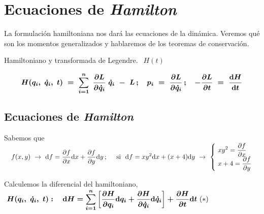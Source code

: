 \chapter{Ecuaciones de \emph{Hamilton}}


\vspace{1cm}

\begin{adjustwidth}{50pt}{50pt}
\begin{ejemplo}
La formulación hamiltoniana nos dará las ecuaciones de la dinámica. Veremos qué son los momentos generalizados y hablaremos de los teoremas de conservación.
\end{ejemplo}
\end{adjustwidth}
	

\vspace{1cm}
\begin{myblock}{Hamiltoniano y transformada de Legendre. $\ \ H(t)$}

\begin{large}
\begin{equation}
\label{T13inicio}
\boldsymbol{
H(q_i,\ \dot q_i,\ t) \ = \ \sum_{i=1}^n\ \pdv{L}{\dot q_i} \ \dot q_i \ - \ L \, ;
\quad
p_i\ = \ \pdv{L}{\dot q_i} \, ; 
\quad
- \pdv{L}{t} \ = \ \dv{H}{t} }	
\end{equation}
\end{large}
\end{myblock}

\vspace{0.5cm}

\section{Ecuaciones de \emph{Hamilton}}

Sabemos que $\quad \displaystyle f(x,y) \ \to \ \dd f=\pdv{f}{x} \dd x + \pdv{f}{y} \dd y \, ; \quad \text{ si } \ \dd f=xy^2 \dd x + (x+4)\dd y \ \to \ \begin{cases} \ \displaystyle xy^2=\pdv{f}{x} \\ \ \displaystyle x+4=\pdv{f}{y} \end{cases}$
 
Calculemos la diferencial del hamiltoniano, $\boldsymbol{ \ H(q_i,\ \dot q_i,\ t) : \quad\displaystyle \dd H=\sum_{i=1}^n \left[ \pdv{H}{q_i} \dd q_i + \pdv{H}{\dot q_i} \dd \dot q_i \right] + \pdv{H}{t} \dd t } \ (*)$


